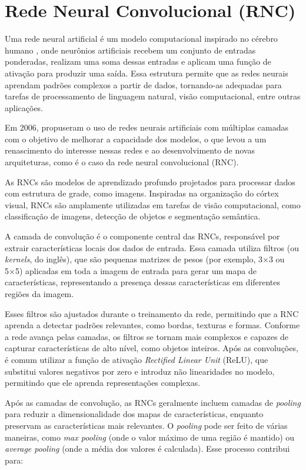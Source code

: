 \section{Rede Neural Convolucional (RNC)}\label{sec:rnc}

Uma rede neural artificial é um modelo computacional inspirado no cérebro humano \cite{McCulloch1943}, onde neurônios artificiais recebem um conjunto de entradas ponderadas, realizam uma soma dessas entradas e aplicam uma função de ativação para produzir uma saída. Essa estrutura permite que as redes neurais aprendam padrões complexos a partir de dados, tornando-as adequadas para tarefas de processamento de linguagem natural, visão computacional, entre outras aplicações.

Em 2006,  propuseram o uso de redes neurais artificiais com múltiplas camadas com o objetivo de melhorar a capacidade dos modelos, o que levou a um renascimento do interesse nessas redes e ao desenvolvimento de novas arquiteturas, como é o caso da rede neural convolucional (RNC).

As RNCs são modelos de aprendizado profundo projetados para processar dados com estrutura de grade, como imagens. Inspiradas na organização do córtex visual, RNCs são amplamente utilizadas em tarefas de visão computacional, como classificação de imagens, detecção de objetos e segmentação semântica.

A camada de convolução é o componente central das RNCs, responsável por extrair características locais dos dados de entrada. Essa camada utiliza filtros (ou \textit{kernels}, do inglês), que são pequenas matrizes de pesos (por exemplo, 3×3 ou 5×5) aplicadas em toda a imagem de entrada para gerar um mapa de características, representando a presença dessas características em diferentes regiões da imagem.

Esses filtros são ajustados durante o treinamento da rede, permitindo que a RNC aprenda a detectar padrões relevantes, como bordas, texturas e formas. Conforme a rede avança pelas camadas, os filtros se tornam mais complexos e capazes de capturar características de alto nível, como objetos inteiros. Após as convoluções, é comum utilizar a função de ativação \textit{Rectified Linear Unit} (ReLU), que substitui valores negativos por zero e introduz não linearidades no modelo, permitindo que ele aprenda representações complexas.

Após as camadas de convolução, as RNCs geralmente incluem camadas de \textit{pooling} para reduzir a dimensionalidade dos mapas de características, enquanto preservam as características mais relevantes. O \textit{pooling} pode ser feito de várias maneiras, como \textit{max pooling} (onde o valor máximo de uma região é mantido) ou \textit{average pooling} (onde a média dos valores é calculada). Esse processo contribui para:

